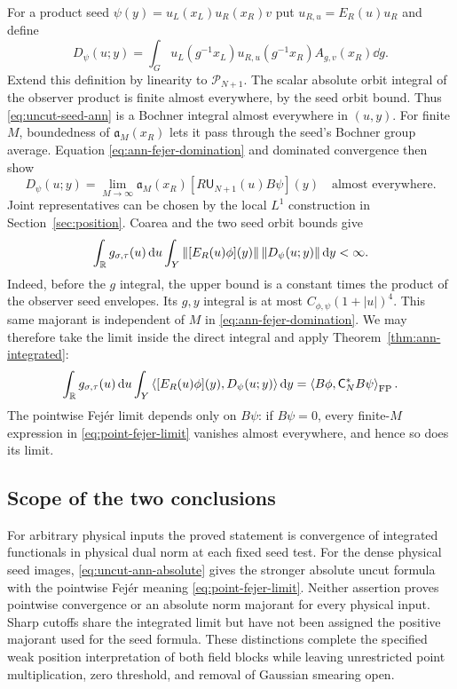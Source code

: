 For a product seed $\psi(y)=u_L(x_L)u_R(x_R)v$ put
$u_{R,u}=E_R(u)u_R$ and define
\begin{equation}
 D_\psi(u;y)=\int_G u_L(g^{-1}x_L)u_{R,u}(g^{-1}x_R)
                    A_{g,v}(x_R)\dd g.
 \label{eq:uncut-seed-ann}
\end{equation}
Extend this definition by linearity to $\mathcal P_{N+1}$.
The scalar absolute orbit integral of the observer product is finite
almost everywhere, by the seed orbit bound. Thus
\eqref{eq:uncut-seed-ann} is a Bochner integral almost everywhere in
$(u,y)$. For finite $M$, boundedness of $\mathfrak a_M(x_R)$ lets it
pass through the seed's Bochner group average. Equation
\eqref{eq:ann-fejer-domination} and dominated convergence then show
\begin{equation}
 D_\psi(u;y)=\lim_{M\to\infty}
 \mathfrak a_M(x_R)[R\mathsf U_{N+1}(u)B\psi](y)
 \quad\text{almost everywhere}.
 \label{eq:point-fejer-limit}
\end{equation}
Joint representatives can be chosen by the local $L^1$ construction in
Section~\ref{sec:position}. Coarea and the two seed orbit bounds give
\begin{equation}
 \int_{\mathbb R}g_{\sigma,\tau}(u)\mathop{}\!\mathrm d u\int_Y
 \left\lVert[E_R(u)\phi](y)\right\rVert\left\lVert D_\psi(u;y)\right\rVert\mathop{}\!\mathrm d y<\infty.
 \label{eq:uncut-ann-absolute}
\end{equation}
Indeed, before the $g$ integral, the upper bound is a constant times
the product of the observer seed envelopes. Its $g,y$ integral is at
most $C_{\phi,\psi}(1+|u|)^4$. This same majorant is independent of $M$
in \eqref{eq:ann-fejer-domination}. We may therefore take the limit
inside the direct integral and apply Theorem~\ref{thm:ann-integrated}:
\begin{equation}
 \int_{\mathbb R}g_{\sigma,\tau}(u)\mathop{}\!\mathrm d u\int_Y
 \left\langle[E_R(u)\phi](y),D_\psi(u;y)\right\rangle\mathop{}\!\mathrm d y
 =\left\langle B\phi,\mathsf C_N^*B\psi\right\rangle_{\mathrm{FP}}.
 \label{eq:uncut-ann-identified}
\end{equation}
The pointwise Fej\'er limit depends only on $B\psi$: if $B\psi=0$,
every finite-$M$ expression in \eqref{eq:point-fejer-limit} vanishes
almost everywhere, and hence so does its limit.

\subsection{Scope of the two conclusions}
For arbitrary physical inputs the proved statement is convergence of
integrated functionals in physical dual norm at each fixed seed test.
For the dense physical seed images, \eqref{eq:uncut-ann-absolute} gives
the stronger absolute uncut formula with the pointwise Fej\'er meaning
\eqref{eq:point-fejer-limit}. Neither assertion proves pointwise
convergence or an absolute norm majorant for every physical input.
Sharp cutoffs share the integrated limit but have not been assigned the
positive majorant used for the seed formula. These distinctions complete
the specified weak position interpretation of both field blocks while
leaving unrestricted point multiplication, zero threshold, and removal
of Gaussian smearing open.
